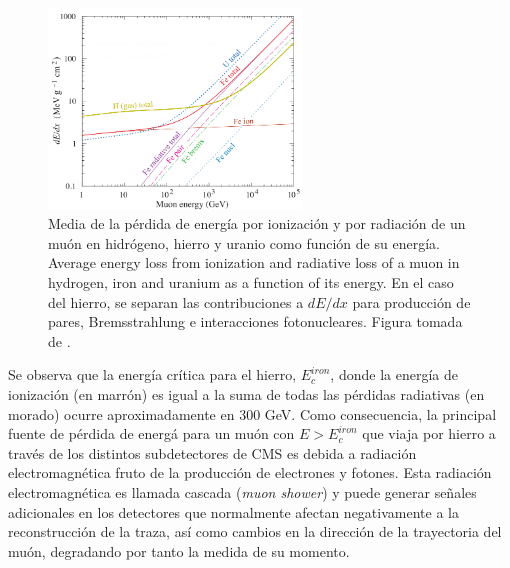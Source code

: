 \begin{figure}
\centering
\includegraphics[width=0.60\textwidth]{figures/dEdx.png}
\caption{Media de la p\'erdida de energ\'ia por ionizaci\'on y por radiaci\'on de un mu\'on en hidr\'ogeno, hierro y uranio como funci\'on de su energ\'ia.  Average energy loss from ionization and radiative loss of a muon in hydrogen, iron and uranium as a function of its energy. En el caso del hierro, se separan las contribuciones a $dE/dx$ para producci\'on de pares, Bremsstrahlung e interacciones fotonucleares. Figura tomada de \cite{Tanabashi:2018oca}.}
\label{fig:dEdX}        
\end{figure}

Se observa que la energ\'ia cr\'itica para el hierro, $E^{iron}_{c}$, donde la energ\'ia de ionizaci\'on (en marr\'on) es igual a la suma de todas las p\'erdidas radiativas (en morado) ocurre aproximadamente en 300 GeV. Como consecuencia, la principal fuente de p\'erdida de energ\'a para un mu\'on con $E>E^{iron}_{c}$ que viaja por hierro a trav\'es de los distintos subdetectores de CMS es debida a radiaci\'on electromagn\'etica fruto de la producci\'on de electrones y fotones. Esta radiaci\'on electromagn\'etica es llamada cascada (\textit{muon shower}) y puede generar se\~nales adicionales en los detectores que normalmente afectan negativamente a la reconstrucci\'on de la traza, as\'i como cambios en la direcci\'on de la trayectoria del mu\'on, degradando por tanto la medida de su momento. \\

